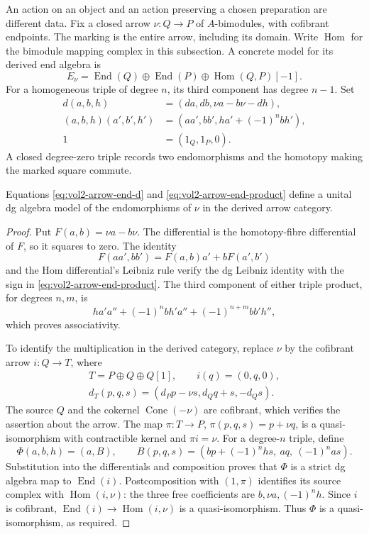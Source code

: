 An action on an object and an action preserving a chosen
preparation are different data. Fix a closed arrow
\(\nu:Q\to P\) of \(A\)-bimodules, with cofibrant endpoints.
The marking is the entire arrow, including its domain.
Write \(\operatorname{Hom}\) for the bimodule mapping complex
in this subsection. A concrete model for its derived end algebra is
\begin{equation}\label{eq:vol2-arrow-end-algebra}
 E_\nu=\operatorname{End}(Q)\oplus\operatorname{End}(P)
                     \oplus\operatorname{Hom}(Q,P)[-1].
\end{equation}
For a homogeneous triple of degree \(n\), its third component
has degree \(n-1\). Set
\begin{align}
 d(a,b,h)&=(da,db,\nu a-b\nu-dh),
       \label{eq:vol2-arrow-end-d}\\
 (a,b,h)(a',b',h')&=(aa',bb',ha'+(-1)^n bh'),
       \label{eq:vol2-arrow-end-product}\\
 1&=(1_Q,1_P,0).\nonumber
\end{align}
A closed degree-zero triple records two endomorphisms and the
homotopy making the marked square commute.

\begin{proposition}\label{prop:vol2-arrow-end-model}
Equations \eqref{eq:vol2-arrow-end-d} and
\eqref{eq:vol2-arrow-end-product} define a unital dg algebra
model of the endomorphisms of \(\nu\) in the derived arrow
category.
\end{proposition}
\begin{proof}
Put \(F(a,b)=\nu a-b\nu\). The differential is the homotopy-fibre
differential of \(F\), so it squares to zero. The identity
\[
 F(aa',bb')=F(a,b)a'+bF(a',b')
\]
and the Hom differential's Leibniz rule verify the dg Leibniz
identity with the sign in
\eqref{eq:vol2-arrow-end-product}. The third component of
either triple product, for degrees \(n,m\), is
\[
 ha'a''+(-1)^n bh'a''+(-1)^{n+m}bb'h'',
\]
which proves associativity.

To identify the multiplication in the derived category, replace
\(\nu\) by the cofibrant arrow \(i:Q\to T\), where
\[
 \begin{gathered}
 T=P\oplus Q\oplus Q[1],\qquad i(q)=(0,q,0),\\
 d_T(p,q,s)=(d_Pp-\nu s,d_Qq+s,-d_Qs).
 \end{gathered}
\]
The source \(Q\) and the cokernel \(\operatorname{Cone}(-\nu)\)
are cofibrant, which verifies the assertion about the arrow.
The map \(\pi:T\to P\), \(\pi(p,q,s)=p+\nu q\), is a
quasi-isomorphism with contractible kernel and \(\pi i=\nu\).
For a degree-\(n\) triple, define
\[
 \Phi(a,b,h)=(a,B),\qquad
 B(p,q,s)=(bp+(-1)^n hs,\ aq,\ (-1)^n as).
\]
Substitution into the differentials and composition proves that
\(\Phi\) is a strict dg algebra map to \(\operatorname{End}(i)\).
Postcomposition with \((1,\pi)\) identifies its source complex
with \(\operatorname{Hom}(i,\nu)\): the three free coefficients
are \(b,\nu a,(-1)^n h\). Since \(i\) is cofibrant,
\(\operatorname{End}(i)\to\operatorname{Hom}(i,\nu)\)
is a quasi-isomorphism. Thus \(\Phi\) is a quasi-isomorphism,
as required.
\end{proof}

